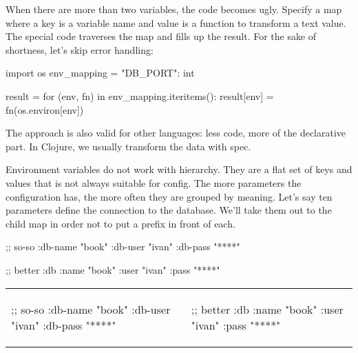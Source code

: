 When there are more than two variables, the code becomes ugly. Specify a map where a key is a variable name and value is a function to transform a text value. The special code traverses the map and fills up the result. For the sake of shortness, let's skip error handling:

\begin{python}
import os
env_mapping = {"DB_PORT": int}

result = {}
for (env, fn) in env_mapping.iteritems():
    result[env] = fn(os.environ[env])
\end{python}

The approach is also valid for other languages: less code, more of the declarative part. In Clojure, we usually transform the data with spec.

Environment variables do not work with hierarchy. They are a flat set of keys and values that is not always suitable for config. The more parameters the configuration has, the more often they are grouped by meaning. Let's say ten parameters define the connection to the database. We'll take them out to the child map in order not to put a prefix in front of each.


\ifnarrow

\begin{clojure}
;; so-so
{:db-name "book"
 :db-user "ivan"
 :db-pass "****"}
\end{clojure}

\splitter

\begin{clojure}
;; better
{:db {:name "book"
      :user "ivan"
      :pass "****"}}
\end{clojure}

\else


\noindent
\begin{tabular}{ @{}p{5cm} @{}p{5cm} }

\begin{clojure}
;; so-so
{:db-name "book"
 :db-user "ivan"
 :db-pass "****"}
\end{clojure}

&

\begin{clojure}
;; better
{:db {:name "book"
      :user "ivan"
      :pass "****"}}
\end{clojure}

\end{tabular}


\fi

